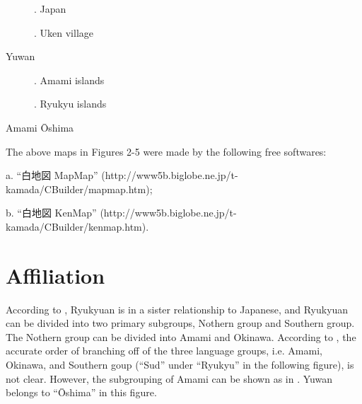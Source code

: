  

\begin{figure}
\textmd{. Japan}
\end{figure}

\begin{figure}
\textmd{. Uken village}
\end{figure}

Yuwan

  
              
 

\begin{figure}
\textmd{. Amami islands}
\end{figure}

\begin{figure}
\textmd{. Ryukyu islands}
\end{figure}

Amami Ōshima

The above maps in Figures 2-5 were made by the following free softwares:

a. “白地図 MapMap” (http://www5b.biglobe.ne.jp/t-kamada/CBuilder/mapmap.htm);

b. “白地図 KenMap” (http://www5b.biglobe.ne.jp/t-kamada/CBuilder/kenmap.htm).

\section{Affiliation}
\hypertarget{RefHeadingToc395696952}{}
According to \citet[771--774, 779--783]{Uemura1992}, Ryukyuan is in a sister relationship to Japanese, and Ryukyuan can be divided into two primary subgroups, Nothern group and Southern group. The Nothern group can be divided into Amami and Okinawa. According to \citet[263]{Pellard2009}, the accurate order of branching off of the three language groups, i.e. Amami, Okinawa, and Southern goup (“Sud” under “Ryukyu” in the following figure), is not clear. However, the subgrouping of Amami can be shown as in . Yuwan belongs to “Ōshima” in this figure.

